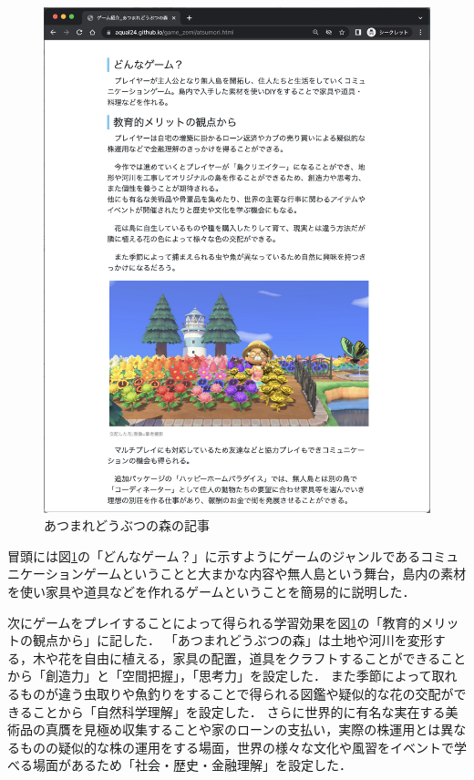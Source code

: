 \vspace{1zh}
\begin{figure}[H]
\begin{center}
 \includegraphics[keepaspectratio, scale=0.35]{PDF/あつ森1.pdf}
\end{center}
 \caption{あつまれどうぶつの森の記事}
 \label{fig:あつ森1}
\end{figure}



冒頭には図\ref{fig:あつ森1}の「どんなゲーム？」に示すようにゲームのジャンルであるコミュニケーションゲームということと大まかな内容や無人島という舞台，島内の素材を使い家具や道具などを作れるゲームということを簡易的に説明した．

次にゲームをプレイすることによって得られる学習効果を図\ref{fig:あつ森1}の「教育的メリットの観点から」に記した．
「あつまれどうぶつの森」は土地や河川を変形する，木や花を自由に植える，家具の配置，道具をクラフトすることができることから「創造力」と「空間把握」，「思考力」を設定した．
また季節によって取れるものが違う虫取りや魚釣りをすることで得られる図鑑や疑似的な花の交配ができることから「自然科学理解」を設定した．
さらに世界的に有名な実在する美術品の真贋を見極め収集することや家のローンの支払い，実際の株運用とは異なるものの疑似的な株の運用をする場面，世界の様々な文化や風習をイベントで学べる場面があるため「社会・歴史・金融理解」を設定した．
